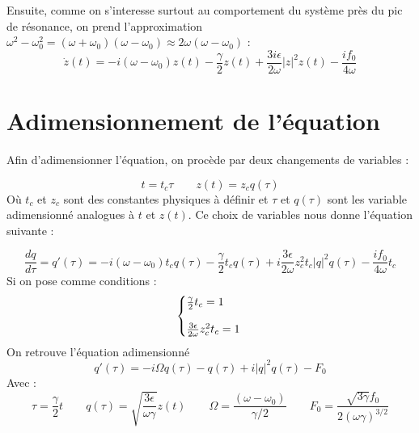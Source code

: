Ensuite, comme on s'interesse surtout au comportement du système près du pic de résonance, 
on prend l'approximation $\omega^2 - \omega_0^2 = (\omega + \omega_0)(\omega - \omega_0) \approx 2\omega(\omega - \omega_0)$ :
\begin{dmath}
    \dot{z}(t) = -i(\omega - \omega_0)z(t)
    - \frac{\gamma}{2} z(t) + \frac{3i\epsilon}{2\omega}|z|^2z(t) - \frac{if_0}{4\omega}
\end{dmath}


\section{Adimensionnement de l'équation}

Afin d'adimensionner l'équation, on procède par deux changements de variables :

\begin{equation}
    t = t_c \tau
    \qquad 
    z(t) = z_c q(\tau)
\end{equation}
Où $t_c$ et $z_c$ sont des constantes physiques à définir et $\tau$ et $q(\tau)$ sont les variable adimensionné analogues à $t$ et $z(t)$.
Ce choix de variables nous donne l'équation suivante :

\begin{equation}
    \frac{dq}{d\tau} = q'(\tau) = -i(\omega - \omega_0)t_c q(\tau) - \frac{\gamma}{2}t_c q(\tau) + i \frac{3\epsilon}{2\omega}z_c^2t_c |q|^2q(\tau) - \frac{if_0}{4\omega}t_c
\end{equation}
Si on pose comme conditions :
\begin{equation}
    \left\{
    \begin{array}{@{}l@{}}
        \frac{\gamma}{2}t_c = 1 \\
        \\
        \frac{3\epsilon}{2\omega}z_c^2t_c = 1
    \end{array}
    \right.\,
\end{equation}
On retrouve l'équation adimensionné
\begin{equation}
    q'(\tau) = -i\Omega q(\tau) - q(\tau) + i|q|^2q(\tau) - F_0
\end{equation}
Avec :
\begin{equation}
    \tau = \frac{\gamma}{2}t
    \qquad
    q(\tau) = \sqrt{\frac{3\epsilon}{\omega\gamma}}z(t)
    \qquad
    \Omega = \frac{(\omega - \omega_0)}{\gamma/2}
    \qquad
    F_0 = \frac{\sqrt{3\gamma}f_0}{2(\omega \gamma)^{3/2}}
\end{equation}

